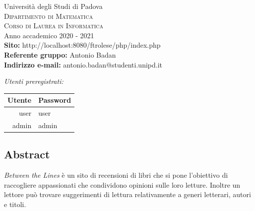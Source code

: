 \documentclass[12pt,a4paper,headings=optiontohead]{article}
\begin{document}
\begin{titlepage}
		\vspace{1.5cm}
		{\LARGE Università degli Studi di Padova}\\[0.4cm] %
		\textsc{\large{Dipartimento di Matematica}}\\[0.05cm]
		\textsc{\large{Corso di Laurea in Informatica}}\\[0.5cm]%
		{\Large Anno accademico 2020 - 2021}\\ %
		
		\vfill %
		\textbf{Sito:} http://localhost:8080/ftrolese/php/index.php \\
		\textbf{Referente gruppo:} Antonio Badan \\
		\textbf{Indirizzo e-mail:} antonio.badan@studenti.unipd.it
		\vfill %
		
		\emph{\Large{Utenti preregistrati:}}\\
		
		\renewcommand{\arraystretch}{1.4}
		\begin{center}
			\begin{tabular}{|r|l|}
				\hline
				\textbf{Utente} & \textbf{Password}  \\ \hline \hline
				user & user \\ \hline
				admin& admin \\ \hline
				
			\end{tabular}
		\end{center}

		
	\end{titlepage}
	
	
	\begin{center}
		\pagebreak
		
		\section*{Abstract}
		\begin{minipage}{0.9\textwidth} 
			\large{\textit{Between the Lines} è un sito di recensioni di libri che si pone l'obiettivo di raccogliere appassionati che condividono opinioni sulle loro letture. Inoltre un lettore può trovare suggerimenti di lettura relativamente a generi letterari, autori e titoli.}
		\end{minipage}
	\end{center}
	\pagebreak
	
\end{document}
